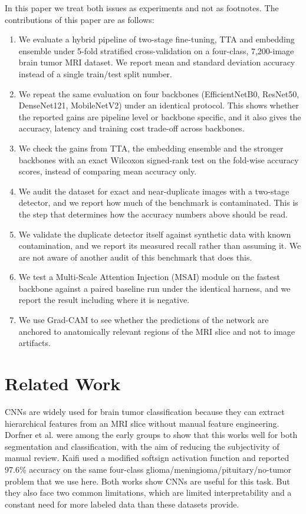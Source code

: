 \documentclass[11pt]{article}
\begin{document}
In this paper we treat both issues as experiments and not as footnotes. The contributions of this paper are as follows:

\begin{enumerate}
    \item We evaluate a hybrid pipeline of two-stage fine-tuning, TTA and embedding ensemble under 5-fold stratified cross-validation on a four-class, 7,200-image brain tumor MRI dataset. We report mean and standard deviation accuracy instead of a single train/test split number.
    \item We repeat the same evaluation on four backbones (EfficientNetB0, ResNet50, DenseNet121, MobileNetV2) under an identical protocol. This shows whether the reported gains are pipeline level or backbone specific, and it also gives the accuracy, latency and training cost trade-off across backbones.
    \item We check the gains from TTA, the embedding ensemble and the stronger backbones with an exact Wilcoxon signed-rank test on the fold-wise accuracy scores, instead of comparing mean accuracy only.
    \item We audit the dataset for exact and near-duplicate images with a two-stage detector, and we report how much of the benchmark is contaminated. This is the step that determines how the accuracy numbers above should be read.
    \item We validate the duplicate detector itself against synthetic data with known contamination, and we report its measured recall rather than assuming it. We are not aware of another audit of this benchmark that does this.
    \item We test a Multi-Scale Attention Injection (MSAI) module on the fastest backbone against a paired baseline run under the identical harness, and we report the result including where it is negative.
    \item We use Grad-CAM to see whether the predictions of the network are anchored to anatomically relevant regions of the MRI slice and not to image artifacts.
\end{enumerate}


\section{Related Work}
\label{sec:related}

CNNs are widely used for brain tumor classification because they can extract hierarchical features from an MRI slice without manual feature engineering. Dorfner et al. \cite{dorfner2025review} were among the early groups to show that this works well for both segmentation and classification, with the aim of reducing the subjectivity of manual review. Kaifi \cite{kaifi2024enhancing} used a modified softsign activation function and reported 97.6\% accuracy on the same four-class glioma/meningioma/pituitary/no-tumor problem that we use here. Both works show CNNs are useful for this task. But they also face two common limitations, which are limited interpretability and a constant need for more labeled data than these datasets provide.
\end{document}
